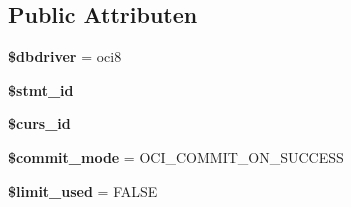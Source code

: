 \subsection*{Public Attributen}
\begin{DoxyCompactItemize}
\item 
\mbox{\label{class_c_i___d_b__oci8__driver_a0cde2a16322a023d040aa7f725877597}} 
{\bfseries \$dbdriver} = \textquotesingle{}oci8\textquotesingle{}
\item 
\mbox{\label{class_c_i___d_b__oci8__driver_a1a97f17fd259cd27c73b65e6c3706ec0}} 
{\bfseries \$stmt\+\_\+id}
\item 
\mbox{\label{class_c_i___d_b__oci8__driver_a75e7d18ad2e68ace3813533c9da2e179}} 
{\bfseries \$curs\+\_\+id}
\item 
\mbox{\label{class_c_i___d_b__oci8__driver_a9b3b7163763603c5a0bcdfd819ae074d}} 
{\bfseries \$commit\+\_\+mode} = O\+C\+I\+\_\+\+C\+O\+M\+M\+I\+T\+\_\+\+O\+N\+\_\+\+S\+U\+C\+C\+E\+SS
\item 
\mbox{\label{class_c_i___d_b__oci8__driver_a96df35d7e3e76bef21ebb80234fe59e8}} 
{\bfseries \$limit\+\_\+used} = F\+A\+L\+SE
\end{DoxyCompactItemize}
